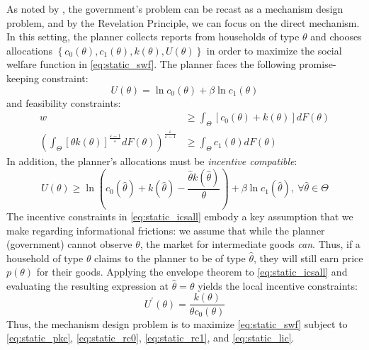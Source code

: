 \documentclass[11pt]{article}
\begin{document}
As noted by \cite{mirrlees1971exploration}, the government's problem can be recast as a mechanism design problem, and by the Revelation Principle, we can focus on the direct mechanism. In this setting, the planner collects reports from households of type \( \theta \) and chooses allocations \( \left\{ c_{0}\left(\theta\right),c_{1}\left(\theta\right),k\left(\theta\right),U\left(\theta\right)\right\} \) in order to maximize the social welfare function in \eqref{eq:static_swf}. The planner faces the following promise-keeping constraint:
\begin{equation}
    U\left(\theta\right)=\ln c_{0}\left(\theta\right)+\beta\ln c_{1}\left(\theta\right) \label{eq:static_pkc}
\end{equation}
and feasibility constraints:
\begin{align}
    w&\ge\int_{\Theta}\left[c_{0}\left(\theta\right)+k\left(\theta\right)\right]dF\left(\theta\right) \label{eq:static_rc0} \\
    \left(\int_{\Theta}\left[\theta k\left(\theta\right)\right]^{\frac{\varepsilon-1}{\varepsilon}}dF\left(\theta\right)\right)^{\frac{\varepsilon}{\varepsilon-1}}&\ge\int_{\Theta}c_{1}\left(\theta\right)dF\left(\theta\right) \label{eq:static_rc1}
\end{align}
In addition, the planner's allocations must be \textit{incentive compatible}:
\begin{equation}
    U\left(\theta\right)\ge\ln\left(c_{0}\left(\hat{\theta}\right)+k\left(\hat{\theta}\right)-\frac{\hat{\theta}k\left(\hat{\theta}\right)}{\theta}\right)+\beta\ln c_{1}\left(\hat{\theta}\right),\ \forall\hat{\theta}\in\Theta \label{eq:static_icsall}
\end{equation}
The incentive constraints in \eqref{eq:static_icsall} embody a key assumption that we make regarding informational frictions: we assume that while the planner (government) cannot observe \( \theta \), the market for intermediate goods \textit{can}. Thus, if a household of type \( \theta \) claims to the planner to be of type \( \hat{\theta} \), they will still earn price \( p\left(\theta\right) \) for their goods. Applying the envelope theorem to \eqref{eq:static_icsall} and evaluating the resulting expression at \( \hat{\theta} = \theta \) yields the local incentive constraints:
\begin{equation}
    U^{\prime}\left(\theta\right)=\frac{k\left(\theta\right)}{\theta c_{0}\left(\theta\right)} \label{eq:static_lic}
\end{equation}
Thus, the mechanism design problem is to maximize \eqref{eq:static_swf} subject to \eqref{eq:static_pkc}, \eqref{eq:static_rc0}, \eqref{eq:static_rc1}, and \eqref{eq:static_lic}. 
\end{document}
